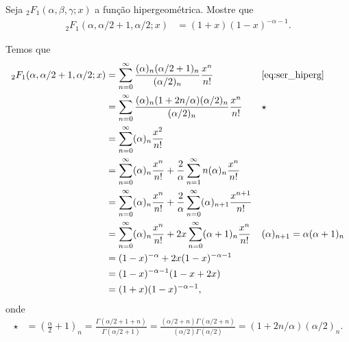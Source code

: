 \documentclass[a4paper,12pt, leqno, answers]{exam}
\begin{document}
\begin{questions}
    \question[Exame de 2011] Seja ${}_2F_1(\alpha, \beta, \gamma; x)$ a fun\c{c}\~{a}o hipergeom\'{e}trica. Mostre que
    \begin{align*}
        {}_2F_1(\alpha, \alpha/2 + 1, \alpha/2; x) &= (1 + x)(1 - x)^{-\alpha - 1}.
    \end{align*}
    \begin{solution}
        Temos que
        \begin{align*}
            {}_2F_1(\alpha, \alpha/2 + 1, \alpha/2; x) &= \sum_{n = 0}^\infty \frac{(\alpha)_n (\alpha/2 + 1)_n}{(\alpha/2)_n} \frac{x^n}{n!} && \text{\eqref{eq:ser_hiperg}} \\
            &= \sum_{n = 0}^\infty \frac{(\alpha)_n (1 + 2 n / \alpha)(\alpha/2)_n}{(\alpha/2)_ n} \frac{x^n}{n!} && \star \\
            &= \sum_{n = 0}^\infty (\alpha)_n \frac{x^2}{n!} \\
            &= \sum_{n = 0}^\infty (\alpha)_n \frac{x^n}{n!} + \frac{2}{\alpha} \sum_{n = 1}^\infty n(\alpha)_n \frac{x^n}{n!} \\
            &= \sum_{n = 0}^\infty (\alpha)_n \frac{x^n}{n!} + \frac{2}{\alpha} \sum_{n = 0}^\infty (\alpha)_{n + 1} \frac{x^{n + 1}}{n!} \\
            &= \sum_{n = 0}^\infty (\alpha)_n \frac{x^n}{n!} + 2x \sum_{n = 0}^\infty (\alpha + 1)_n \frac{x^n}{n!} && (\alpha)_{n + 1} = \alpha (\alpha + 1)_n \\
            &= (1 - x)^{-\alpha} + 2 x (1 - x)^{-\alpha - 1} \\
            &= (1 - x)^{- \alpha - 1} (1 - x + 2x) \\
            &=(1 + x)(1 - x)^{-\alpha - 1},
        \end{align*}
        onde
        \begin{align*}
            \star &= \left( \frac{\alpha}{2} + 1 \right)_n = \frac{\Gamma(\alpha/2 + 1 + n)}{\Gamma(\alpha/2 + 1)} = \frac{(\alpha/2 + n) \Gamma(\alpha/2 + n)}{(\alpha/2) \Gamma(\alpha/2)} = (1 + 2n/\alpha) (\alpha/2)_n.
        \end{align*}
    \end{solution}
\end{questions}


\end{document}
